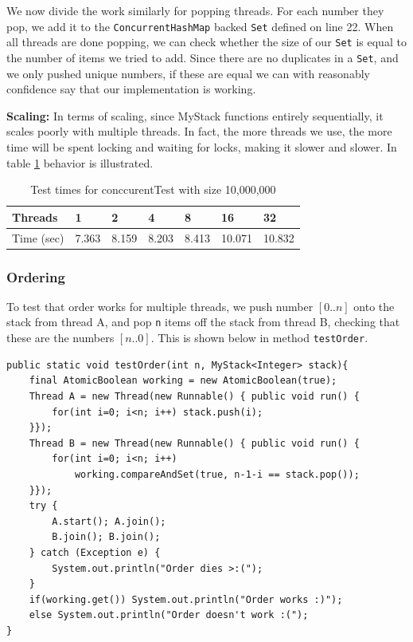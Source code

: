 \documentclass[a5paper]{article}
\begin{document}
We now divide the work similarly for popping threads. For each number they pop, we add it to the \texttt{ConcurrentHashMap} backed \texttt{Set} defined on line 22. 
When all threads are done popping, we can check whether the size of our \texttt{Set} is equal to the number of items we tried to add. 
Since there are no duplicates in a \texttt{Set}, and we only pushed unique numbers, if these are equal we can with reasonably confidence say that our implementation is working.

\textbf{Scaling:} In terms of scaling, since MyStack functions entirely sequentially, it scales poorly with multiple threads. In fact, the more threads we use, the more time will be spent 
locking and waiting for locks, making it slower and slower. In table \ref{table:concTest} behavior is illustrated.

\begin{table}[ht!]
\centering
\begin{tabular}{|l|l|l|l|l|l|l|}
\hline
Threads & 1 & 2 & 4 & 8 & 16 & 32 \\ \hline
Time (sec) & 7.363 & 8.159 & 8.203 & 8.413 & 10.071 & 10.832 \\ \hline
\end{tabular}
\caption{Test times for conccurentTest with size 10,000,000}
\label{table:concTest}
\end{table}
\subsubsection{Ordering} \label{sec:ordering}
To test that order works for multiple threads, we push number $[0..n]$ onto the stack from thread A, and pop \texttt{n} items off the stack from thread B,
checking that these are the numbers $[n..0]$.
This is shown below in method \texttt{testOrder}.

\begin{lstlisting}
public static void testOrder(int n, MyStack<Integer> stack){
    final AtomicBoolean working = new AtomicBoolean(true);
    Thread A = new Thread(new Runnable() { public void run() {
        for(int i=0; i<n; i++) stack.push(i);
    }});
    Thread B = new Thread(new Runnable() { public void run() {
        for(int i=0; i<n; i++) 
            working.compareAndSet(true, n-1-i == stack.pop());
    }});
    try {
        A.start(); A.join();
        B.join(); B.join();
    } catch (Exception e) { 
        System.out.println("Order dies >:("); 
    }
    if(working.get()) System.out.println("Order works :)");
    else System.out.println("Order doesn't work :(");
}
\end{lstlisting}
\end{document}

